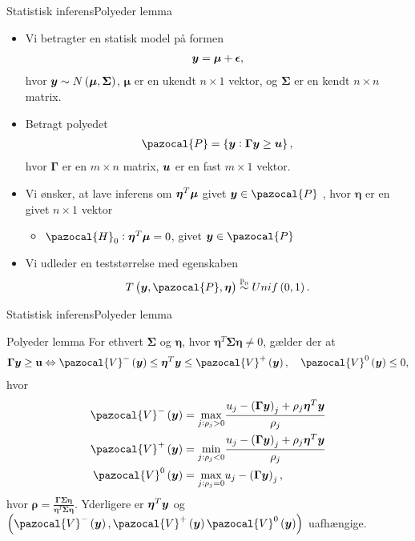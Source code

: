 \begin{frame}{Statistisk inferens}{Polyeder lemma}
\begin{itemize}
\item Vi betragter en statisk model på formen
\begin{align*}
\vy = \vmu + \veps, 
\end{align*}
hvor $\vy \sim N\del{\boldsymbol\mu, \boldsymbol\Sigma}$, $\boldsymbol \mu$ er en ukendt $n \times 1$ vektor, og $\boldsymbol\Sigma$ er en kendt $n \times n$ matrix. 
\item Betragt polyedet
\begin{align*}
\pazocal{P} = \cbr{\vy: \boldsymbol \Gamma \vy \geq \vu},
\end{align*} 
hvor $\boldsymbol \Gamma $ er en $m \times n$ matrix, $\bm{u}$ er en fast $m \times 1$ vektor.
\item Vi ønsker, at lave inferens om $\boldsymbol \eta^T \bm{\mu}$ givet $\vy \in \pazocal{P}$ , hvor $\boldsymbol \eta$ er en givet $n \times 1$ vektor
\begin{itemize}
\item $\pazocal{H}_0: \boldsymbol \eta^T \boldsymbol \mu = 0$, givet $\vy \in \pazocal{P}$
\end{itemize} 
\item Vi udleder en teststørrelse med egenskaben
\begin{align*}
T\del{ \vy, \pazocal{P}, \boldsymbol \eta} \overset{\mathbb{P}_0}{\sim} Unif \del{0,1}.
\end{align*}
\end{itemize}
\end{frame}

\begin{frame}{Statistisk inferens}{Polyeder lemma}
\begin{block}{Polyeder lemma}
For ethvert $\boldsymbol \Sigma$ og $\boldsymbol \eta$, hvor $\boldsymbol \eta^T \boldsymbol  \Sigma \boldsymbol \eta \neq 0$, gælder der at
\begin{align*}
\boldsymbol \Gamma \vy \geq \textbf{u} \Leftrightarrow \pazocal{V}^- \del{\vy} \leq \boldsymbol \eta^T \vy \leq  \pazocal{V}^+\del{\vy}, \quad  \pazocal{V}^0 \del{\vy} \leq 0,
\end{align*}
hvor 
\begin{align*}
\pazocal{V}^- \del{\vy} & = \underset{j: \rho_j >0}{\max} \frac{u_j - \del{ \boldsymbol \Gamma \vy}_j + \rho_j \boldsymbol \eta^T \vy}{\rho_j} \\
\pazocal{V}^+ \del{\vy} & = \underset{j: \rho_j < 0}{\min} \frac{u_j - \del{ \boldsymbol \Gamma \vy}_j + \rho_j \boldsymbol \eta^T \vy}{\rho_j}  \\
\pazocal{V}^0 \del{\vy}  &=  \underset{j: \rho_j = 0}{\max} u_j -  \del{ \boldsymbol \Gamma \vy}_j
,\end{align*}
hvor $\boldsymbol \rho = \frac{\boldsymbol \Gamma \boldsymbol \Sigma \boldsymbol \eta}{\boldsymbol \eta^T \boldsymbol \Sigma \boldsymbol \eta}$. 
Yderligere er $\boldsymbol \eta^T \bm{y}$ og $\del{\pazocal{V}^- \del{\vy} , \pazocal{V}^+ \del{\vy} \pazocal{V}^0 \del{\vy}  }$ uafhængige.
\end{block}
\end{frame}

